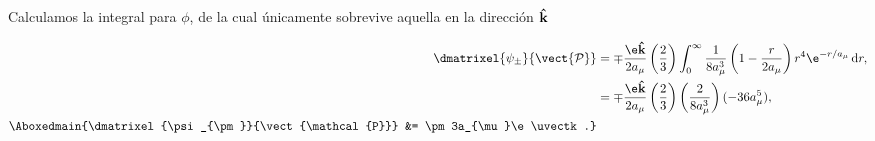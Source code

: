 \documentclass[./../main.tex]{subfiles}
\begin{document}
\begin{exercise}
\begin{enumerate}
\begin{solution}
                Calculamos la integral para \(\phi\), de la cual únicamente sobrevive aquella en la dirección \(\uvectk\)

                \begin{align*}
                    \dmatrixel{\psi_{\pm}}{\vect{\mathcal{P}}} &= \mp \dfrac{\e\uvectk}{2a_{\mu}}\left(\dfrac{2}{3}\right)\int_{0}^{\infty}\dfrac{1}{8a_{\mu}^{3}}\left(1 - \dfrac{r}{2a_{\mu}}\right)r^{4}\e^{-r/a_{\mu}}\odif{r},\\
                    &= \mp \dfrac{\e\uvectk}{2a_{\mu}}\left(\dfrac{2}{3}\right)\left(\dfrac{2}{8a_{\mu}^{3}}\right)(-36a_{\mu}^{5}),\\
                    \Aboxedmain{\dmatrixel{\psi_{\pm}}{\vect{\mathcal{P}}} &= \pm 3a_{\mu}\e\uvectk.}
                \end{align*}
            \end{solution}
        \end{enumerate}
    \end{exercise}
\end{document}
